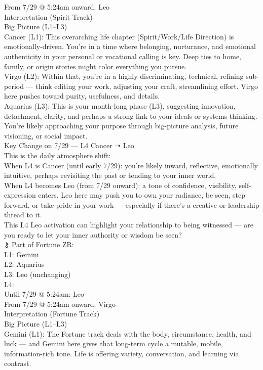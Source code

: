 \documentclass{article}
\begin{document}
From 7/29 @ 5:24am onward: Leo\\
Interpretation (Spirit Track)\\
Big Picture (L1--L3)\\
Cancer (L1): This overarching life chapter (Spirit/Work/Life Direction) is emotionally-driven. You're in a time where belonging, nurturance, and emotional authenticity in your personal or vocational calling is key. Deep ties to home, family, or origin stories might color everything you pursue.\\
Virgo (L2): Within that, you're in a highly discriminating, technical, refining sub-period --- think editing your work, adjusting your craft, streamlining effort. Virgo here pushes toward purity, usefulness, and details.\\
Aquarius (L3): This is your month-long phase (L3), suggesting innovation, detachment, clarity, and perhaps a strong link to your ideals or systems thinking. You're likely approaching your purpose through big-picture analysis, future visioning, or social impact.\\
Key Change on 7/29 --- L4 Cancer ➝ Leo\\
This is the daily atmosphere shift:\\
When L4 is Cancer (until early 7/29): you're likely inward, reflective, emotionally intuitive, perhaps revisiting the past or tending to your inner world.\\
When L4 becomes Leo (from 7/29 onward): a tone of confidence, visibility, self-expression enters. Leo here may push you to own your radiance, be seen, step forward, or take pride in your work --- especially if there's a creative or leadership thread to it.\\
This L4 Leo activation can highlight your relationship to being witnessed --- are you ready to let your inner authority or wisdom be seen?\\
⚷ Part of Fortune ZR:\\
L1: Gemini\\
L2: Aquarius\\
L3: Leo (unchanging)\\
L4:\\
Until 7/29 @ 5:24am: Leo\\
From 7/29 @ 5:24am onward: Virgo\\
Interpretation (Fortune Track)\\
Big Picture (L1--L3)\\
Gemini (L1): The Fortune track deals with the body, circumstance, health, and luck --- and Gemini here gives that long-term cycle a mutable, mobile, information-rich tone. Life is offering variety, conversation, and learning via contrast.\\
\end{document}
